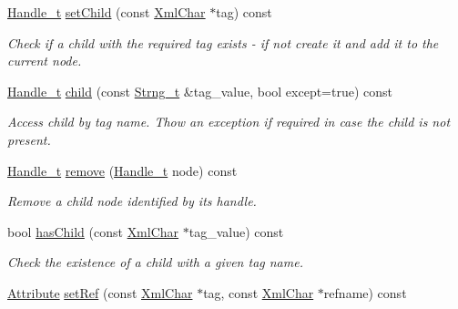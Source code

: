 \begin{DoxyCompactItemize}
\hyperlink{class_d_d4hep_1_1_x_m_l_1_1_handle__t}{Handle\_\-t} \hyperlink{class_d_d4hep_1_1_x_m_l_1_1_element_ad21b7661b1923c0d845c784dc8f8979b}{setChild} (const \hyperlink{namespace_d_d4hep_1_1_x_m_l_a09e5d9cc86ed782f6826dfe0778c1815}{XmlChar} $\ast$tag) const 
\begin{DoxyCompactList}\small\item\em Check if a child with the required tag exists -\/ if not create it and add it to the current node. \item\end{DoxyCompactList}\item 
\hyperlink{class_d_d4hep_1_1_x_m_l_1_1_handle__t}{Handle\_\-t} \hyperlink{class_d_d4hep_1_1_x_m_l_1_1_element_a8f38a8aee8b5006d8eabe3d47e240f34}{child} (const \hyperlink{class_d_d4hep_1_1_x_m_l_1_1_strng__t}{Strng\_\-t} \&tag\_\-value, bool except=true) const 
\begin{DoxyCompactList}\small\item\em Access child by tag name. Thow an exception if required in case the child is not present. \item\end{DoxyCompactList}\item 
\hyperlink{class_d_d4hep_1_1_x_m_l_1_1_handle__t}{Handle\_\-t} \hyperlink{class_d_d4hep_1_1_x_m_l_1_1_element_aa4c8525669df70abc7b72d8bd9847b1e}{remove} (\hyperlink{class_d_d4hep_1_1_x_m_l_1_1_handle__t}{Handle\_\-t} node) const 
\begin{DoxyCompactList}\small\item\em Remove a child node identified by its handle. \item\end{DoxyCompactList}\item 
bool \hyperlink{class_d_d4hep_1_1_x_m_l_1_1_element_a8a8400cf5dacb724fa688e8fbb89b005}{hasChild} (const \hyperlink{namespace_d_d4hep_1_1_x_m_l_a09e5d9cc86ed782f6826dfe0778c1815}{XmlChar} $\ast$tag\_\-value) const 
\begin{DoxyCompactList}\small\item\em Check the existence of a child with a given tag name. \item\end{DoxyCompactList}\item 
\hyperlink{namespace_d_d4hep_1_1_x_m_l_a5c19b7116be99d69b4b22d911357baaf}{Attribute} \hyperlink{class_d_d4hep_1_1_x_m_l_1_1_element_a481707ff2e5959e9b15193d80e85632a}{setRef} (const \hyperlink{namespace_d_d4hep_1_1_x_m_l_a09e5d9cc86ed782f6826dfe0778c1815}{XmlChar} $\ast$tag, const \hyperlink{namespace_d_d4hep_1_1_x_m_l_a09e5d9cc86ed782f6826dfe0778c1815}{XmlChar} $\ast$refname) const 

\end{DoxyCompactItemize}
